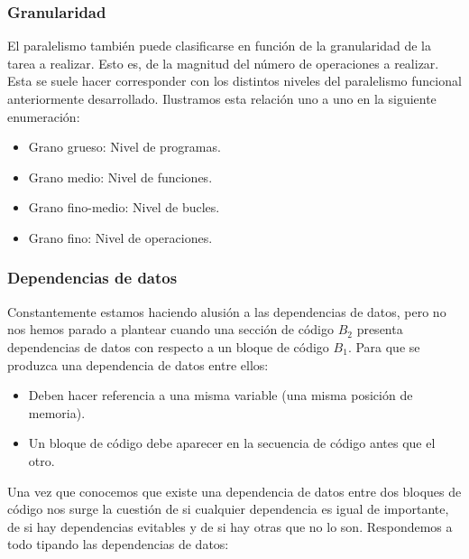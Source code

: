 \subsubsection{Granularidad}
El paralelismo también puede clasificarse en función de la granularidad de la tarea a realizar. Esto es, de la magnitud del número de operaciones a realizar. Esta se suele hacer corresponder con los distintos niveles del paralelismo funcional anteriormente desarrollado. Ilustramos esta relación uno a uno en la siguiente enumeración:
\begin{itemize}
    \item Grano grueso: Nivel de programas.
    \item Grano medio: Nivel de funciones.
    \item Grano fino-medio: Nivel de bucles.
    \item Grano fino: Nivel de operaciones.
\end{itemize}

\subsubsection{Dependencias de datos}
Constantemente estamos haciendo alusión a las dependencias de datos, pero no nos hemos parado a plantear cuando una sección de código $B_2$ presenta dependencias de datos con respecto a un bloque de código $B_1$. Para que se produzca una dependencia de datos entre ellos:
\begin{itemize}
    \item Deben hacer referencia a una misma variable (una misma posición de memoria).
    \item Un bloque de código debe aparecer en la secuencia de código antes que el otro.
\end{itemize}

Una vez que conocemos que existe una dependencia de datos entre dos bloques de código nos surge la cuestión de si cualquier dependencia es igual de importante, de si hay dependencias evitables y de si hay otras que no lo son. Respondemos a todo tipando las dependencias de datos:

